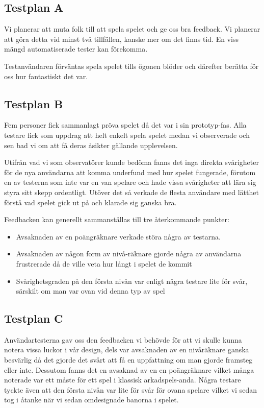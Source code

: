 \documentclass[a4paper,11pt]{article}
\begin{document}
\subsection{Testplan A}
Vi planerar att muta folk till att spela spelet och ge oss bra feedback. Vi planerar att göra detta vid minst två tillfällen, kanske mer om det finns tid. En viss mängd automatiserade tester kan förekomma.

Testanvändaren förväntas spela spelet tills ögonen blöder och därefter berätta för oss hur fantastiskt det var. 

\subsection{Testplan B}
Fem personer fick sammanlagt pröva spelet då det var i sin prototyp-fas. Alla testare fick som uppdrag att helt enkelt spela spelet medan vi observerade och sen bad vi om att få deras åsikter gällande upplevelsen.

Utifrån vad vi som observatörer kunde bedöma fanns det inga direkta svårigheter för de nya användarna att komma underfund med hur spelet fungerade, förutom en av testerna som inte var en van spelare och hade vissa svårigheter att lära sig styra sitt skepp ordentligt. Utöver det så verkade de flesta användare med lätthet förstå vad spelet gick ut på och klarade sig ganska bra.

Feedbacken kan generellt sammanställas till tre återkommande punkter:
\begin{itemize}
\item Avsaknaden av en poängräknare verkade störa några av testarna.
\item Avsaknaden av någon form av nivå-räknare gjorde några av användarna frustrerade då de ville veta hur långt i spelet de kommit
\item Svårighetsgraden på den första nivån var enligt några testare lite för svår, särskilt om man var ovan vid denna typ av spel
\end{itemize} 


\subsection{Testplan C}
Användartesterna gav oss den feedbacken vi behövde för att vi skulle kunna notera vissa luckor i vår design, dels var avsaknaden av en nivåräknare ganska besvärlig då det gjorde det svårt att få en uppfattning om man gjorde framsteg eller inte. Dessutom fanns det en avsaknad av en en poängräknare vilket många noterade var ett måste för ett spel i klassisk arkadspels-anda. Några testare tyckte även att den första nivån var lite för svår för ovana spelare vilket vi sedan tog i åtanke när vi sedan omdesignade banorna i spelet.
\end{document}
